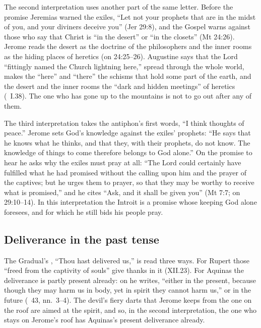 The second interpretation uses another part of the same letter. Before the
promise Jeremias warned the exiles, ``Let not your prophets that are in the
midst of you, and your diviners deceive you'' (Jer 29:8), and the Gospel
warns against those who say that Christ is ``in the desert'' or ``in the
closets'' (Mt 24:26). Jerome reads the desert as the doctrine of the
philosophers and the inner rooms as the hiding places of heretics (on
24:25--26). Augustine says that the Lord ``fittingly named the Church
lightning here,'' spread through the whole world, makes the ``here'' and
``there'' the schisms that hold some part of the earth, and the desert and
the inner rooms the ``dark and hidden meetings'' of heretics
(~I.38). The one who has gone up to the
mountains is not to go out after any of them.

The third interpretation takes the antiphon's first words, ``I think thoughts
of peace.'' Jerome sets God's knowledge against the exiles' prophets: ``He
says that he knows what he thinks, and that they, with their prophets, do not
know. The knowledge of things to come therefore belongs to God alone.'' On the
promise to hear he asks why the exiles must pray at all: ``The Lord could
certainly have fulfilled what he had promised without the calling upon him
and the prayer of the captives; but he urges them to prayer, so that they may
be worthy to receive what is promised,'' and he cites ``Ask, and it shall be
given you'' (Mt 7:7; on 29:10--14). In this interpretation the Introit is a
promise whose keeping God alone foresees, and for which he still bids his
people pray.

\subsection{Deliverance in the past tense}

The Gradual's , ``Thou hast delivered us,'' is read three
ways. For Rupert those ``freed from the captivity of souls'' give thanks in it
(XII.23). For Aquinas the deliverance is partly present already: on
 he writes, ``either in the
present, because though they may harm us in body, yet in spirit they cannot
harm us,'' or in the future (~43, nn.~3--4). The devil's
fiery darts that Jerome keeps from the one on the roof are aimed at the
spirit, and so, in the second interpretation, the one who stays on Jerome's
roof has Aquinas's present deliverance already.


